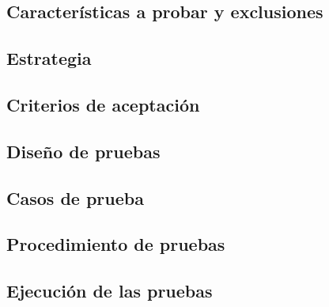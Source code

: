 \subsection{Características a probar y exclusiones}

\subsection{Estrategia}

\subsection{Criterios de aceptación}

\subsection{Diseño de pruebas}

\subsection{Casos de prueba}

\subsection{Procedimiento de pruebas}

\subsection{Ejecución de las pruebas}